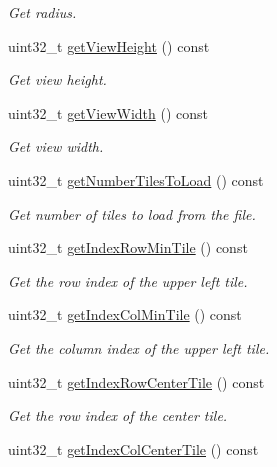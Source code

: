 \begin{DoxyCompactItemize}
\begin{DoxyCompactList}\small\item\em Get radius. \end{DoxyCompactList}\item 
uint32\+\_\+t \hyperlink{classfi_1_1HTGSViewRequestData_ac62cf82ff21f65ecf2ba90dee912fc9f}{get\+View\+Height} () const
\begin{DoxyCompactList}\small\item\em Get view height. \end{DoxyCompactList}\item 
uint32\+\_\+t \hyperlink{classfi_1_1HTGSViewRequestData_aafef77b23d12e92405ca56602e68ddba}{get\+View\+Width} () const
\begin{DoxyCompactList}\small\item\em Get view width. \end{DoxyCompactList}\item 
uint32\+\_\+t \hyperlink{classfi_1_1HTGSViewRequestData_abd7de0d0a3785d999a861da5c995906e}{get\+Number\+Tiles\+To\+Load} () const
\begin{DoxyCompactList}\small\item\em Get number of tiles to load from the file. \end{DoxyCompactList}\item 
uint32\+\_\+t \hyperlink{classfi_1_1HTGSViewRequestData_a931645cb254aff9dd249fb9a683f17c9}{get\+Index\+Row\+Min\+Tile} () const
\begin{DoxyCompactList}\small\item\em Get the row index of the upper left tile. \end{DoxyCompactList}\item 
uint32\+\_\+t \hyperlink{classfi_1_1HTGSViewRequestData_a61be0d71f0f014a4771370e7c36c018d}{get\+Index\+Col\+Min\+Tile} () const
\begin{DoxyCompactList}\small\item\em Get the column index of the upper left tile. \end{DoxyCompactList}\item 
uint32\+\_\+t \hyperlink{classfi_1_1HTGSViewRequestData_a75cb6c1101620ad695592d3ac872ab51}{get\+Index\+Row\+Center\+Tile} () const
\begin{DoxyCompactList}\small\item\em Get the row index of the center tile. \end{DoxyCompactList}\item 
uint32\+\_\+t \hyperlink{classfi_1_1HTGSViewRequestData_a123411ba1e7aa49a934a8191409b8d81}{get\+Index\+Col\+Center\+Tile} () const

\end{DoxyCompactItemize}
